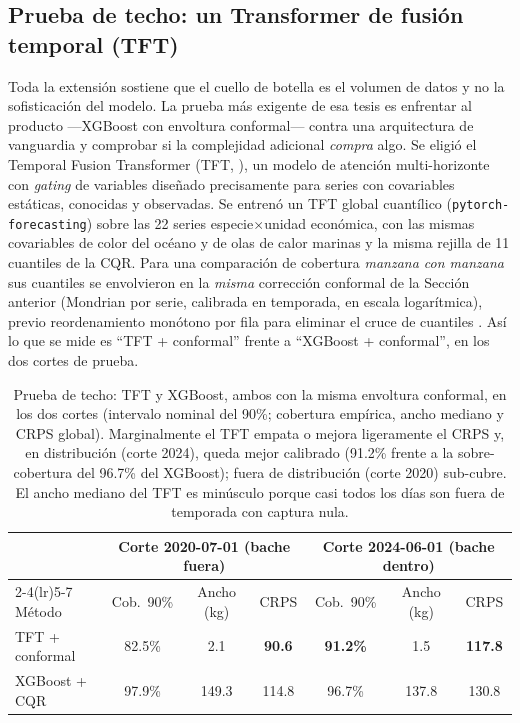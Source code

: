\subsection{Prueba de techo: un Transformer de fusión temporal (TFT)}
\label{sec:extension_tft}
Toda la extensión sostiene que el cuello de botella es el volumen de datos y no la sofisticación del modelo. La prueba más exigente de esa tesis es enfrentar al producto ---XGBoost con envoltura conformal--- contra una arquitectura de vanguardia y comprobar si la complejidad adicional \emph{compra} algo. Se eligió el Temporal Fusion Transformer (TFT, \citealp{lim2021}), un modelo de atención multi-horizonte con \emph{gating} de variables diseñado precisamente para series con covariables estáticas, conocidas y observadas. Se entrenó un TFT global cuantílico (\texttt{pytorch-forecasting}) sobre las 22 series especie$\times$unidad económica, con las mismas covariables de color del océano y de olas de calor marinas y la misma rejilla de 11 cuantiles de la CQR. Para una comparación de cobertura \emph{manzana con manzana} sus cuantiles se envolvieron en la \emph{misma} corrección conformal de la Sección anterior (Mondrian por serie, calibrada en temporada, en escala logarítmica), previo reordenamiento monótono por fila para eliminar el cruce de cuantiles \citep{chernozhukov2010}. Así lo que se mide es ``TFT + conformal'' frente a ``XGBoost + conformal'', en los dos cortes de prueba.

\begin{table}[htbp]
\centering
\small
\begin{tabular}{lcccccc}
\toprule
 & \multicolumn{3}{c}{Corte 2020-07-01 (bache fuera)} & \multicolumn{3}{c}{Corte 2024-06-01 (bache dentro)} \\
\cmidrule(lr){2-4}\cmidrule(lr){5-7}
Método & Cob.\ 90\% & Ancho (kg) & CRPS & Cob.\ 90\% & Ancho (kg) & CRPS \\
\midrule
TFT + conformal & 82.5\% & 2.1 & \textbf{90.6} & \textbf{91.2\%} & 1.5 & \textbf{117.8} \\
XGBoost + CQR & 97.9\% & 149.3 & 114.8 & 96.7\% & 137.8 & 130.8 \\
\bottomrule
\end{tabular}
\caption{Prueba de techo: TFT y XGBoost, ambos con la misma envoltura conformal, en los dos cortes (intervalo nominal del 90\%; cobertura empírica, ancho mediano y CRPS global). Marginalmente el TFT empata o mejora ligeramente el CRPS y, en distribución (corte 2024), queda mejor calibrado (91.2\% frente a la sobre-cobertura del 96.7\% del XGBoost); fuera de distribución (corte 2020) sub-cubre. El ancho mediano del TFT es minúsculo porque casi todos los días son fuera de temporada con captura nula.}
\label{tab:extension_tft}
\end{table}

